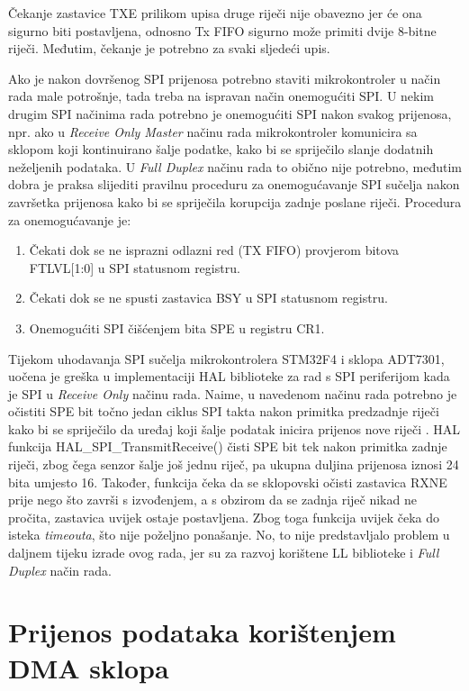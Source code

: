 		Čekanje zastavice TXE prilikom upisa druge riječi nije obavezno jer će ona sigurno biti postavljena, odnosno Tx FIFO sigurno može primiti dvije 8-bitne riječi. Međutim, čekanje je potrebno za svaki sljedeći upis.
	
		Ako je nakon dovršenog SPI prijenosa potrebno staviti mikrokontroler u način rada male potrošnje, tada treba na ispravan način onemogućiti SPI. U nekim drugim SPI načinima rada potrebno je onemogućiti SPI nakon svakog prijenosa, npr. ako u \textit{Receive Only Master} načinu rada mikrokontroler komunicira sa sklopom koji kontinuirano šalje podatke, kako bi se spriječilo slanje dodatnih neželjenih podataka. U \textit{Full Duplex} načinu rada to obično nije potrebno, međutim dobra je praksa slijediti pravilnu proceduru za onemogućavanje SPI sučelja nakon završetka prijenosa kako bi se spriječila korupcija zadnje poslane riječi. Procedura za onemogućavanje je:
		
		\begin{enumerate}
			\item Čekati dok se ne isprazni odlazni red (TX FIFO) provjerom bitova FTLVL[1:0] u SPI statusnom registru.
			\item Čekati dok se ne spusti zastavica BSY u SPI statusnom registru.
			\item Onemogućiti SPI čišćenjem bita SPE u registru CR1.
		\end{enumerate}
		
		Tijekom uhodavanja SPI sučelja mikrokontrolera STM32F4 i sklopa ADT7301, uočena je greška u implementaciji HAL biblioteke za rad s SPI periferijom kada je SPI u \textit{Receive Only} načinu rada. Naime, u navedenom načinu rada potrebno je očistiti SPE bit točno jedan ciklus SPI takta nakon primitka predzadnje riječi kako bi se spriječilo da uređaj koji šalje podatak inicira prijenos nove riječi \cite[str.~894]{stm32f4_manual}. HAL funkcija HAL\_SPI\_TransmitReceive() čisti SPE bit tek nakon primitka zadnje riječi, zbog čega senzor šalje još jednu riječ, pa ukupna duljina prijenosa iznosi 24 bita umjesto 16. Također, funkcija čeka da se sklopovski očisti zastavica RXNE prije nego što završi s izvođenjem, a s obzirom da se zadnja riječ nikad ne pročita, zastavica uvijek ostaje postavljena. Zbog toga funkcija uvijek čeka do isteka \textit{timeouta}, što nije poželjno ponašanje. No, to nije predstavljalo problem u daljnem tijeku izrade ovog rada, jer su za razvoj korištene LL biblioteke i \textit{Full Duplex} način rada.
		
	\section{Prijenos podataka korištenjem DMA sklopa}
		
